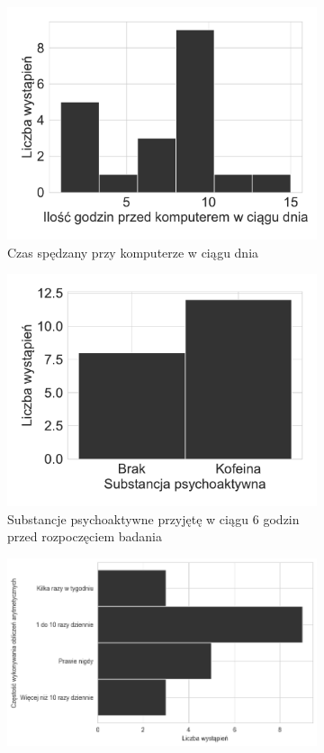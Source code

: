 \documentclass{./assets/wfis}
\begin{document}
\begin{figure}[h!]
\begin{subfigure}[b]{0.45\textwidth}
    \includegraphics[width=\columnwidth]{thesis/plots/computer_hours.pdf}
    \caption{Czas spędzany przy komputerze w ciągu dnia}
    \label{fig:computer-time}
\end{subfigure}   
\hfill
\begin{subfigure}[b]{0.45\textwidth}
    \centering
    \includegraphics[width=\columnwidth]{thesis/plots/psychoactive_substances.pdf}
    \caption{Substancje psychoaktywne przyjętę w ciągu 6 godzin przed rozpoczęciem badania}
    \label{fig:psychoactive-substances}
\end{subfigure}
\begin{subfigure}[b]{\textwidth}
\centering
    \includegraphics[width=0.75\columnwidth]{thesis/assets/mental_math.png}

\end{subfigure}
\end{figure}
\end{document}
